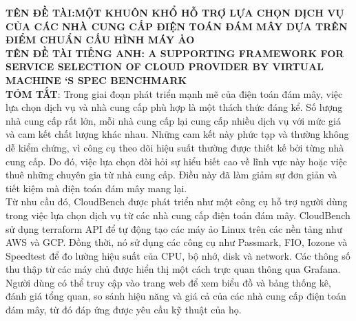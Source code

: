 \documentclass{article}
\begin{document}




\textbf{TÊN ĐỀ TÀI:MỘT KHUÔN KHỔ HỖ TRỢ LỰA CHỌN DỊCH VỤ CỦA CÁC NHÀ CUNG CẤP ĐIỆN TOÁN ĐÁM MÂY DỰA TRÊN ĐIỂM CHUẨN CẤU HÌNH MÁY ẢO} \\

\textbf{TÊN ĐỀ TÀI TIẾNG ANH: A SUPPORTING FRAMEWORK FOR SERVICE SELECTION OF CLOUD PROVIDER BY VIRTUAL MACHINE ‘S SPEC BENCHMARK} \\

\textbf{TÓM TẮT}: Trong giai đoạn phát triển mạnh mẽ của điện toán đám mây, việc lựa chọn dịch vụ và nhà cung cấp phù hợp là một thách thức đáng kể. Số lượng nhà cung cấp rất lớn, mỗi nhà cung cấp lại cung cấp nhiều dịch vụ với mức giá và cam kết chất lượng khác nhau. Những cam kết này phức tạp và thường không dễ kiểm chứng, vì công cụ theo dõi hiệu suất thường được thiết kế bởi từng nhà cung cấp. Do đó, việc lựa chọn đòi hỏi sự hiểu biết cao về lĩnh vực này hoặc việc thuê những chuyên gia từ nhà cung cấp. Điều này đã làm giảm sự đơn giản và tiết kiệm mà điện toán đám mây mang lại. \\

Từ nhu cầu đó, CloudBench được phát triển như một công cụ hỗ trợ người dùng trong việc lựa chọn dịch vụ từ các nhà cung cấp điện toán đám mây. CloudBench sử dụng terraform API để tự động tạo các máy ảo Linux trên các nền tảng như AWS và GCP. Đồng thời, nó sử dụng các công cụ như Passmark, FIO, Iozone và Speedtest để đo lường hiệu suất của CPU, bộ nhớ, disk và network. Các thông số thu thập từ các máy chủ được hiển thị một cách trực quan thông qua Grafana. Người dùng có thể truy cập vào trang web để xem biểu đồ và bảng thống kê, đánh giá tổng quan, so sánh hiệu năng và giá cả của các nhà cung cấp điện toán đám mây, từ đó đáp ứng được yêu cầu kỹ thuật của họ. \\
\end{document}
